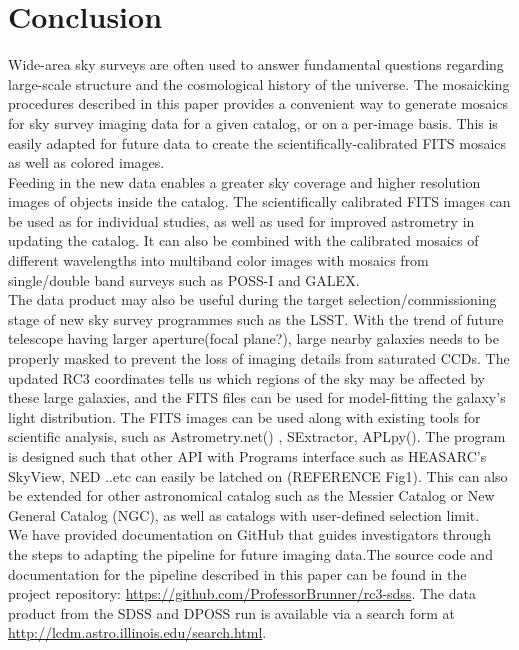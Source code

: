 \documentclass[5p]{elsarticle}
\begin{document}
 \section{Conclusion}
\indent Wide-area sky surveys are often used to answer fundamental questions regarding large-scale structure and the cosmological history of the universe. The mosaicking procedures described in this paper provides a convenient way to generate mosaics for sky survey imaging data for a given catalog, or on a per-image basis. This is easily adapted for future data to create the scientifically-calibrated FITS mosaics as well as colored images. 
\\
\indent Feeding in the new data enables a greater  sky coverage and higher resolution images of objects inside the catalog. The scientifically calibrated FITS images can be used as for individual studies, as well as used for improved astrometry in updating the catalog. It can also be combined with the calibrated mosaics of different wavelengths into multiband color images with mosaics from single/double band surveys such as POSS-I and GALEX.  %
\\
\indent The data product may also be useful  during  the target selection/commissioning stage of new sky survey programmes such as the LSST. With the trend of future telescope having larger aperture(focal plane?), large nearby galaxies needs to be properly masked to prevent the loss of imaging details from saturated CCDs. The updated RC3 coordinates tells us  which regions of the sky may be affected by these large galaxies, and the FITS files can be used for model-fitting the galaxy's light distribution. The FITS images can be used along with existing tools for scientific analysis, such as Astrometry.net(\citet{astrometry.net}) , SExtractor, APLpy(\citet{aplpy}). The program is designed such that other API with Programs interface such as HEASARC's SkyView, NED ..etc can easily be latched on (REFERENCE Fig1). This can also be extended for other astronomical catalog such as the Messier Catalog or New General Catalog (NGC), as well as catalogs with user-defined selection limit. %
\\
\indent We have provided documentation on GitHub  that guides investigators through the steps to adapting the pipeline for future imaging data.The source code and documentation for the pipeline described in this paper can be found in the project repository: \url{https://github.com/ProfessorBrunner/rc3-sdss}. The data product from the SDSS and DPOSS run is available via a search form at \url{http://lcdm.astro.illinois.edu/search.html}.
\end{document}
